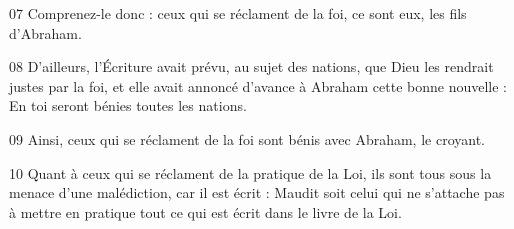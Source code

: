 
07 Comprenez-le donc : ceux qui se réclament de la foi, ce sont eux, les fils d’Abraham.

08 D’ailleurs, l’Écriture avait prévu, au sujet des nations, que Dieu les rendrait justes par la foi, et elle avait annoncé d’avance à Abraham cette bonne nouvelle : En toi seront bénies toutes les nations.

09 Ainsi, ceux qui se réclament de la foi sont bénis avec Abraham, le croyant.

10 Quant à ceux qui se réclament de la pratique de la Loi, ils sont tous sous la menace d’une malédiction, car il est écrit : Maudit soit celui qui ne s’attache pas à mettre en pratique tout ce qui est écrit dans le livre de la Loi.
